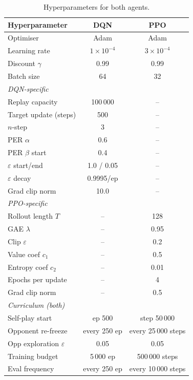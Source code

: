 \documentclass[10pt, letterpaper, twocolumn]{article}
\newcommand{\eps}{\varepsilon}
\begin{document}
\begin{table}[ht]
\centering
\small
\caption{Hyperparameters for both agents.}
\label{tab:hyperparams}
\begin{tabular}{lcc}
\toprule
\textbf{Hyperparameter} & \textbf{DQN} & \textbf{PPO} \\
\midrule
Optimiser              & Adam          & Adam \\
Learning rate          & $1 \times 10^{-4}$ & $3 \times 10^{-4}$ \\
Discount $\gamma$      & 0.99          & 0.99 \\
Batch size             & 64            & 32 \\
\midrule
\multicolumn{3}{l}{\textit{DQN-specific}} \\
Replay capacity        & 100\,000      & -- \\
Target update (steps)  & 500           & -- \\
$n$-step               & 3             & -- \\
PER $\alpha$           & 0.6           & -- \\
PER $\beta$ start      & 0.4           & -- \\
$\varepsilon$ start/end & 1.0 / 0.05  & -- \\
$\varepsilon$ decay    & 0.9995/ep     & -- \\
Grad clip norm         & 10.0          & -- \\
\midrule
\multicolumn{3}{l}{\textit{PPO-specific}} \\
Rollout length $T$     & --            & 128 \\
GAE $\lambda$          & --            & 0.95 \\
Clip $\varepsilon$     & --            & 0.2 \\
Value coef $c_1$       & --            & 0.5 \\
Entropy coef $c_2$     & --            & 0.01 \\
Epochs per update      & --            & 4 \\
Grad clip norm         & --            & 0.5 \\
\midrule
\multicolumn{3}{l}{\textit{Curriculum (both)}} \\
Self-play start        & ep 500        & step 50\,000 \\
Opponent re-freeze     & every 250 ep  & every 25\,000 steps \\
Opp exploration $\eps$ & 0.05          & 0.05 \\
\midrule
Training budget        & 5\,000 ep     & 500\,000 steps \\
Eval frequency         & every 250 ep  & every 10\,000 steps \\
\bottomrule
\end{tabular}
\end{table}
\end{document}
